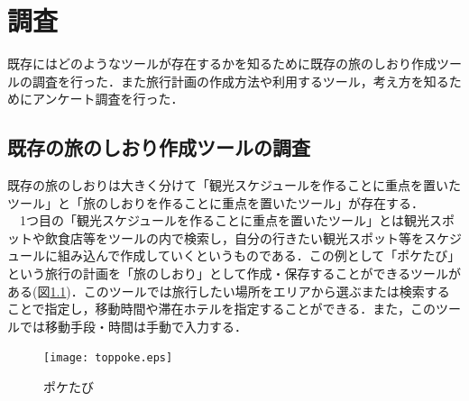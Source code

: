 \documentclass{funthesis}
\begin{document}






\chapter{調査}%

既存にはどのようなツールが存在するかを知るために既存の旅のしおり作成ツールの調査を行った．また旅行計画の作成方法や利用するツール，考え方を知るためにアンケート調査を行った．


\section{既存の旅のしおり作成ツールの調査}

既存の旅のしおりは大きく分けて「観光スケジュールを作ることに重点を置いたツール」と「旅のしおりを作ることに重点を置いたツール」が存在する．\\
　1つ目の「観光スケジュールを作ることに重点を置いたツール」とは観光スポットや飲食店等をツールの内で検索し，自分の行きたい観光スポット等をスケジュールに組み込んで作成していくというものである．この例として「ポケたび」という旅行の計画を「旅のしおり」\cite{poketrip}として作成・保存することができるツールがある(図\ref{Ltoppoke})．このツールでは旅行したい場所をエリアから選ぶまたは検索することで指定し，移動時間や滞在ホテルを指定することができる．また，このツールでは移動手段・時間は手動で入力する．

\begin{figure}[htpb]
\begin{center}
\texttt{[image: toppoke.eps]}
\end{center}
\caption{ポケたび}
\label{Ltoppoke}
\end{figure}
\end{document}
